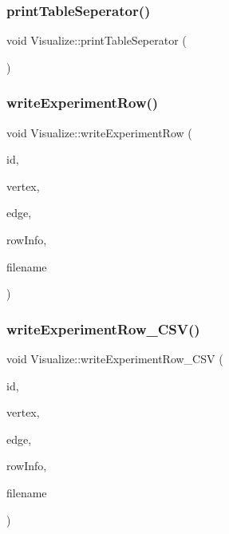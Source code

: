 \subsubsection{\texorpdfstring{print\+Table\+Seperator()}{printTableSeperator()}}
{\footnotesize\ttfamily void Visualize\+::print\+Table\+Seperator (\begin{DoxyParamCaption}{ }\end{DoxyParamCaption})}

\mbox{\label{class_visualize_a8aefacec622221533485db6701d1119e_a8aefacec622221533485db6701d1119e}} 
\subsubsection{\texorpdfstring{write\+Experiment\+Row()}{writeExperimentRow()}}
{\footnotesize\ttfamily void Visualize\+::write\+Experiment\+Row (\begin{DoxyParamCaption}\item[{int}]{id,  }\item[{int}]{vertex,  }\item[{int}]{edge,  }\item[{std\+::vector$<$ \hyperlink{struct_utility_structs_1_1_storage_items}{Utility\+Structs\+::\+Storage\+Items} $>$}]{row\+Info,  }\item[{std\+::string}]{filename }\end{DoxyParamCaption})}

\mbox{\label{class_visualize_a8677a063c82af1b37b94c7d3a3ca3746_a8677a063c82af1b37b94c7d3a3ca3746}} 
\subsubsection{\texorpdfstring{write\+Experiment\+Row\+\_\+\+C\+S\+V()}{writeExperimentRow\_CSV()}}
{\footnotesize\ttfamily void Visualize\+::write\+Experiment\+Row\+\_\+\+C\+SV (\begin{DoxyParamCaption}\item[{int}]{id,  }\item[{int}]{vertex,  }\item[{int}]{edge,  }\item[{std\+::vector$<$ \hyperlink{struct_utility_structs_1_1_storage_items}{Utility\+Structs\+::\+Storage\+Items} $>$}]{row\+Info,  }\item[{std\+::string}]{filename }\end{DoxyParamCaption})}

